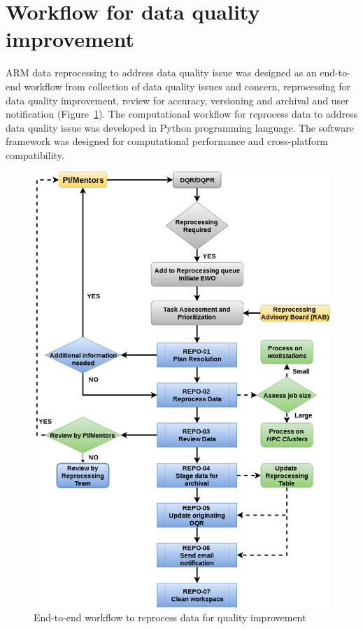 \section{Workflow for data quality improvement}
ARM data reprocessing to address data quality issue was
designed as an end-to-end workflow from collection of data quality
issues and concern, reprocessing for data quality improvement, review
for accuracy, versioning and archival and user notification (Figure~\ref{fig:flowchart}).
The computational workflow for reprocess data to address data quality
issue was developed in Python programming language. The software
framework was designed for computational performance and cross-platform
compatibility. 

\begin{figure}
 \includegraphics[width=\linewidth]{figures/reprocessing_flowchart.png}
 \caption{End-to-end workflow to reprocess data for quality improvement}
 \label{fig:flowchart}
\end{figure}












